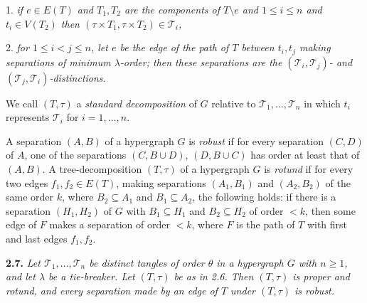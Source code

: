 \hspace*{12pt}1. \textit{if $e \in E(T)$ and $T_1, T_2$ are the components of $T \setminus e$ and $1 \le i \le n$ and $t_i \in V(T_2)$ then $(\tau \times T_1, \tau \times T_2) \in \mathscr{T}_i$,}

\hspace*{12pt}2. \textit{for $1 \le i < j \le n$, let $e$ be the edge of the path of $T$ between $t_i, t_j$ making separations of minimum $\lambda$-order; then these separations are the $(\mathscr{T}_i, \mathscr{T}_j)$- and $(\mathscr{T}_j, \mathscr{T}_i)$-distinctions.}

We call $(T, \tau)$ a \textit{standard decomposition} of $G$ relative to $\mathscr{T}_1, \dots, \mathscr{T}_n$ in which $t_i$ represents $\mathscr{T}_i$ for $i = 1, \dots, n$.

A separation $(A, B)$ of a hypergraph $G$ is \textit{robust} if for every separation $(C, D)$ of $A$, one of the separations $(C, B \cup D)$, $(D, B \cup C)$ has order at least that of $(A, B)$. A tree-decomposition $(T, \tau)$ of a hypergraph $G$ is \textit{rotund} if for every two edges $f_1, f_2 \in E(T)$, making separations $(A_1, B_1)$ and $(A_2, B_2)$ of the same order $k$, where $B_2 \subseteq A_1$ and $B_1 \subseteq A_2$, the following holds: if there is a separation $(H_1, H_2)$ of $G$ with $B_1 \subseteq H_1$ and $B_2 \subseteq H_2$ of order $< k$, then some edge of $F$ makes a separation of order $< k$, where $F$ is the path of $T$ with first and last edges $f_1, f_2$.

\textbf{2.7.} \textit{Let $\mathscr{T}_1, \dots, \mathscr{T}_n$ be distinct tangles of order $\theta$ in a hypergraph $G$ with $n \ge 1$, and let $\lambda$ be a tie-breaker. Let $(T, \tau)$ be as in 2.6. Then $(T, \tau)$ is proper and rotund, and every separation made by an edge of $T$ under $(T, \tau)$ is robust.}

